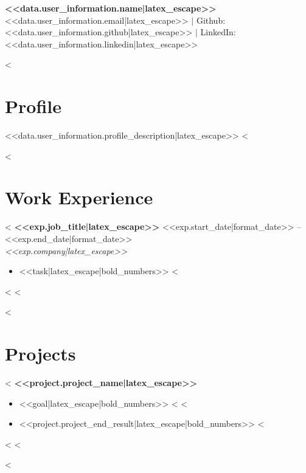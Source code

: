 \documentclass[letterpaper,11pt]{article}
\begin{document}
\begin{center}
    {\huge\textbf{<<data.user_information.name|latex_escape>>}} \\
    \vspace{2mm}
    <<data.user_information.email|latex_escape>> $|$
    Github: <<data.user_information.github|latex_escape>> $|$
    LinkedIn: <<data.user_information.linkedin|latex_escape>>
\end{center}

<%
\section*{Profile}
<<data.user_information.profile_description|latex_escape>>
<%

<%
\section*{Work Experience}
<%
\textbf{<<exp.job_title|latex_escape>>} \hfill <<exp.start_date|format_date>> -- <<exp.end_date|format_date>> \\
\textit{<<exp.company|latex_escape>>} \\
\begin{itemize}
    <%
    \item <<task|latex_escape|bold_numbers>>
    <%
\end{itemize}
<%
<%

<%
\section*{Projects}
<%
\textbf{<<project.project_name|latex_escape>>} \\
\begin{itemize}
    <%
    \item <<goal|latex_escape|bold_numbers>>
    <%
    <%
    \item <<project.project_end_result|latex_escape|bold_numbers>>
    <%
\end{itemize}
<%
<%

<%
\end{document}
